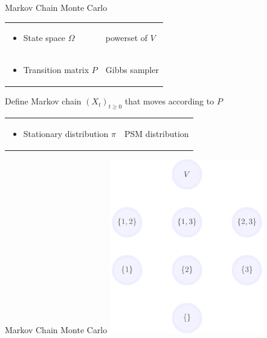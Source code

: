 \documentclass[mathserif]{beamer}
\begin{document}
\begin{frame}{Markov Chain Monte Carlo}
\begin{tabular}{*{2}{@{}l}}
\begin{minipage}{0.45\textwidth}
\begin{itemize}
\item State space $\Omega$
\end{itemize}
\end{minipage} & \color{col1}powerset of $V$\\[1em]
\begin{minipage}{0.45\textwidth}
\begin{itemize}
\item Transition matrix $P$
\end{itemize}
\end{minipage} & \color{col1}Gibbs sampler
\end{tabular}

\vspace{3em}
Define Markov chain $\left(X_t\right)_{t \geq 0}$ that moves according to $P$

\vspace{2em}
\begin{tabular}{*{2}{@{}l}}
\begin{minipage}{0.45\textwidth}
\begin{itemize}
\item Stationary distribution $\pi$
\end{itemize}
\end{minipage} & \color{col1}PSM distribution
\end{tabular}
\end{frame}

\begin{frame}{Markov Chain Monte Carlo}
\vspace{0.5em}
\centering
\includegraphics[height=3in]{figures/lattice_nodes_only.pdf}
\end{frame}
\end{document}
